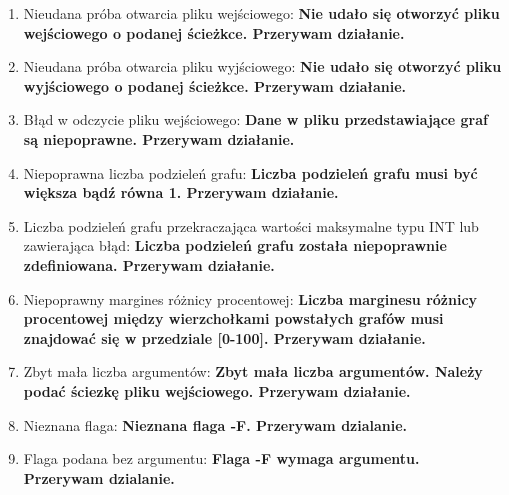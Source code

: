 \documentclass{article}
\begin{document}
\begin{enumerate}
  \item Nieudana próba otwarcia pliku wejściowego: \textbf{Nie udało się otworzyć pliku wejściowego o podanej ścieżkce. Przerywam działanie.}

  \item Nieudana próba otwarcia pliku wyjściowego: \textbf{Nie udało się otworzyć pliku wyjściowego o podanej ścieżkce. Przerywam działanie.}
  
  \item Błąd w odczycie pliku wejściowego: \textbf{Dane w pliku przedstawiające graf są niepoprawne. Przerywam działanie.}
  
  \item Niepoprawna liczba podzieleń grafu: \textbf{Liczba podzieleń grafu musi być większa bądź równa 1. Przerywam działanie.}

  \item Liczba podzieleń grafu przekraczająca wartości maksymalne typu INT lub zawierająca błąd: \textbf{Liczba podzieleń grafu została niepoprawnie zdefiniowana. Przerywam działanie.}
  
  
  \item Niepoprawny margines różnicy procentowej: \textbf{Liczba marginesu różnicy procentowej między wierzchołkami powstałych grafów musi znajdować się w przedziale [0-100]. Przerywam działanie.}

  \item Zbyt mała liczba argumentów: \textbf{Zbyt mała liczba argumentów. Należy podać ściezkę pliku wejściowego. Przerywam działanie.}

  \item Nieznana flaga: \textbf{Nieznana flaga -F. Przerywam dzialanie.}

  \item Flaga podana bez argumentu: \textbf{Flaga -F wymaga argumentu. Przerywam dzialanie.}
  
\end{enumerate}
\end{document}
